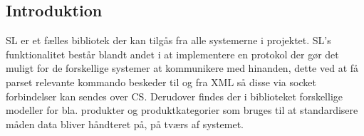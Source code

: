 \subsection{Introduktion}

\gls{SL} er et fælles bibliotek der kan tilgås fra alle systemerne i projektet. \gls{SL}'s funktionalitet består blandt andet i at implementere en protokol der gør det muligt for de forskellige systemer at kommunikere med hinanden, dette ved at få parset relevante kommando beskeder til og fra XML så disse via socket forbindelser kan sendes over \gls{CS}. Derudover findes der i biblioteket forskellige modeller for bla. produkter og produktkategorier som bruges til at standardisere måden data bliver håndteret på, på tværs af systemet.